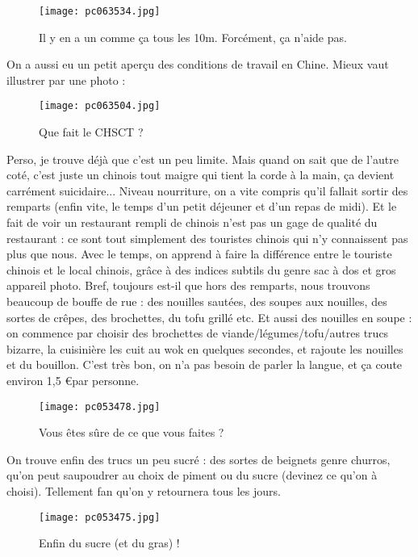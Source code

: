 \documentclass{book}
\begin{document}
\begin{figure}[h]
\centering
\texttt{[image: pc063534.jpg]}
\caption*{Il y en a un comme ça tous les 10m. Forcément, ça n'aide pas.}
\end{figure}

On a aussi eu un petit aperçu des conditions de travail en Chine. Mieux vaut illustrer par une photo :


\begin{figure}[h]
\centering
\texttt{[image: pc063504.jpg]}
\caption*{Que fait le CHSCT ?}
\end{figure}

Perso, je trouve déjà que c'est un peu limite. Mais quand on sait que de l'autre coté, c'est juste un chinois tout maigre qui tient la corde à la main, ça devient carrément suicidaire...
Niveau nourriture, on a vite compris qu'il fallait sortir des remparts (enfin vite, le temps d'un petit déjeuner et d'un repas de midi). Et le fait de voir un restaurant rempli de chinois n'est pas un gage de qualité du restaurant : ce sont tout simplement des touristes chinois qui n'y connaissent pas plus que nous. Avec le temps, on apprend à faire la différence entre le touriste chinois et le local chinois, grâce à des indices subtils du genre sac à dos et gros appareil photo. Bref, toujours est-il que hors des remparts, nous trouvons beaucoup de bouffe de rue : des nouilles sautées, des soupes aux nouilles, des sortes de crêpes, des brochettes, du tofu grillé etc. Et aussi des nouilles en soupe : on commence par choisir des brochettes de viande/légumes/tofu/autres trucs bizarre, la cuisinière les cuit au wok en quelques secondes, et rajoute les nouilles et du bouillon. C'est très bon, on n'a pas besoin de parler la langue, et ça coute environ 1,5 \euro par personne.


\begin{figure}[h]
\centering
\texttt{[image: pc053478.jpg]}
\caption*{Vous êtes sûre de ce que vous faites ?}
\end{figure}

On trouve enfin des trucs un peu sucré : des sortes de beignets genre churros, qu'on peut saupoudrer au choix de piment ou du sucre (devinez ce qu'on à choisi). Tellement fan qu'on y retournera tous les jours.


\begin{figure}[h]
\centering
\texttt{[image: pc053475.jpg]}
\caption*{Enfin du sucre (et du gras) !}
\end{figure}
\end{document}
